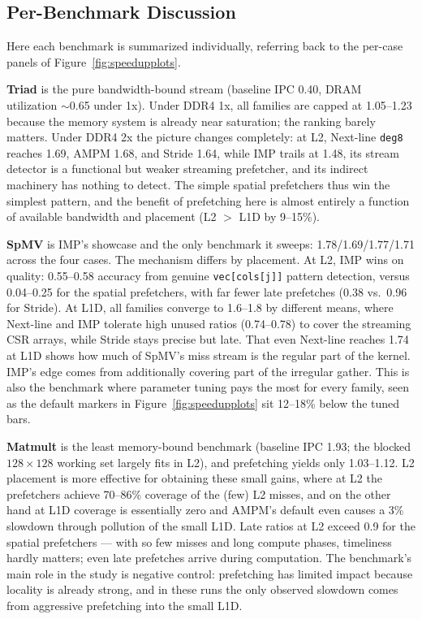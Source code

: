 \documentclass[12pt, letterpaper]{article}
\begin{document}
\FloatBarrier
\subsection{Per-Benchmark Discussion}
\label{sec:res:per-benchmark}

Here each benchmark is summarized individually, referring back to the per-case panels of Figure~\ref{fig:speedupplots}.

\noindent\textbf{Triad} is the pure bandwidth-bound stream (baseline IPC 0.40, DRAM utilization $\sim$0.65 under 1x). Under DDR4 1x, all families are capped at 1.05--1.23 because the memory system is already near saturation; the ranking barely matters. Under DDR4 2x the picture changes completely: at L2, Next-line \texttt{deg8} reaches 1.69, AMPM 1.68, and Stride 1.64, while IMP trails at 1.48, its stream detector is a functional but weaker streaming prefetcher, and its indirect machinery has nothing to detect. The simple spatial prefetchers thus win the simplest pattern, and the benefit of prefetching here is almost entirely a function of available bandwidth and placement (L2 $>$ L1D by 9--15\%).

\noindent\textbf{SpMV} is IMP's showcase and the only benchmark it sweeps: 1.78/1.69/1.77/1.71 across the four cases. The mechanism differs by placement. At L2, IMP wins on quality: 0.55--0.58 accuracy from genuine \texttt{vec[cols[j]]} pattern detection, versus 0.04--0.25 for the spatial prefetchers, with far fewer late prefetches (0.38 vs.\ 0.96 for Stride). At L1D, all families converge to 1.6--1.8 by different means, where Next-line and IMP tolerate high unused ratios (0.74--0.78) to cover the streaming CSR arrays, while Stride stays precise but late. That even Next-line reaches 1.74 at L1D shows how much of SpMV's miss stream is the regular part of the kernel. IMP's edge comes from additionally covering part of the irregular gather. This is also the benchmark where parameter tuning pays the most for every family, seen as the default markers in Figure~\ref{fig:speedupplots} sit 12--18\% below the tuned bars.

\noindent\textbf{Matmult} is the least memory-bound benchmark (baseline IPC 1.93; the blocked $128\times128$ working set largely fits in L2), and prefetching yields only 1.03--1.12. L2 placement is more effective for obtaining these small gains, where at L2 the prefetchers achieve 70--86\% coverage of the (few) L2 misses, and on the other hand at L1D coverage is essentially zero and AMPM's default even causes a 3\% slowdown through pollution of the small L1D. Late ratios at L2 exceed 0.9 for the spatial prefetchers --- with so few misses and long compute phases, timeliness hardly matters; even late prefetches arrive during computation. The benchmark's main role in the study is negative control: prefetching has limited impact because locality is already strong, and in these runs the only observed slowdown comes from aggressive prefetching into the small L1D.
\end{document}
